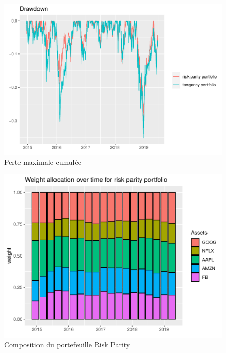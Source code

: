 \documentclass[
]{article}
\begin{document}
\begin{figure}
\centering
\includegraphics{TP-4_files/figure-latex/unnamed-chunk-8-1.pdf}
\caption{Perte maximale cumulée}
\end{figure}

\begin{figure}
\centering
\includegraphics{TP-4_files/figure-latex/unnamed-chunk-9-1.pdf}
\caption{Composition du portefeuille Risk Parity}
\end{figure}
\end{document}
